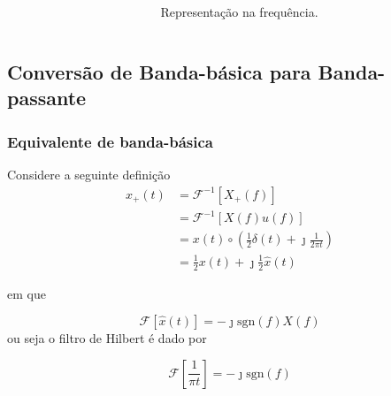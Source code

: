 \documentclass[10pt,hyperref={pdfpagemode=FullScreen},aspectratio=169]{beamer}
\begin{document}
\begin{frame}
\begin{columns}
\begin{column}{0.5\textwidth}
    \end{column}

    \begin{column}{0.5\textwidth}
      
      \begin{figure}[!t]
        \begin{center}
          \caption{Representação na frequência.}
        \end{center}
      \end{figure}

    \end{column}
  \end{columns}


\end{frame}

\subsection{Conversão de Banda-básica para Banda-passante}

\begin{frame}
  \frametitle{Equivalente de banda-básica}

  Considere a seguinte definição 
  \begin{align*}
  x_+(t) &=  \mathcal{F}^{-1}[X_+(f)] \\
         &=  \mathcal{F}^{-1}[X(f)u(f)] \\
         &=  x(t) \circ (\frac{1}{2} \delta (t) + \jmath \frac{1}{2\pi t}) \\
         &=  \frac{1}{2}x(t) + \jmath \frac{1}{2}\hat{x}(t)
  \end{align*}
  
  
  em que 
  
  $$ 
   \mathcal{F}[\hat{x}(t)] = -\jmath \textrm{sgn}(f)X(f)
  $$
  ou seja o filtro de Hilbert é dado por
  
  $$
  \mathcal{F}[\frac{1}{\pi t}]  =  -\jmath \textrm{sgn}(f)
  $$
  

\end{frame}
\end{document}
